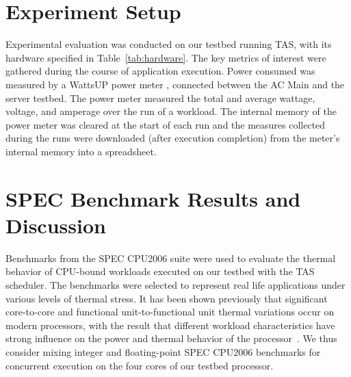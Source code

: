 \section{Experiment Setup}
\label{sec:experiment-setup} 
Experimental evaluation was conducted on our testbed running TAS, with
its hardware specified in Table~\ref{tab:hardware}.  The key metrics of
interest were gathered during the course of application execution.
Power consumed was measured by a WattsUP power meter
\cite{WattsUp2006a}, connected between the AC Main and the server
testbed.  The power meter measured the total and average wattage,
voltage, and amperage over the run of a workload.  The internal memory
of the power meter was cleared at the start of each run and the measures
collected during the runs were downloaded (after execution completion)
from the meter's internal memory into a spreadsheet.

\section{SPEC Benchmark Results and Discussion}
\label{sec:microarch} 
Benchmarks from the SPEC CPU2006 suite \cite{Henning2006} were used to
evaluate the thermal behavior of CPU-bound workloads executed on our
testbed with the TAS scheduler.  The benchmarks were selected to
represent real life applications under various levels of thermal
stress. It has been shown previously \cite{Choi2007,Cher2011} that
significant core-to-core and functional unit-to-functional unit thermal
variations occur on modern processors, with the result that different
workload characteristics have strong influence on the power and thermal
behavior of the processor~\cite{Jimenez2010}.  We thus consider mixing
integer and floating-point SPEC CPU2006 benchmarks for concurrent
execution on the four cores of our testbed processor.  

